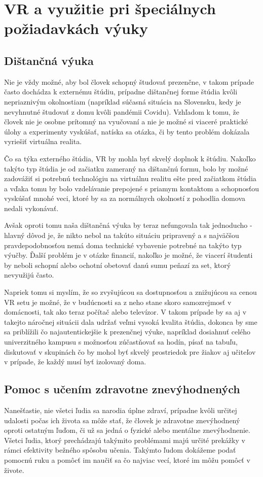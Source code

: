 \documentclass[10pt,twoside,slovak,a4paper]{article}
\begin{document}
\section{VR a využitie pri špeciálnych požiadavkách výuky} \label{stvrta}

\subsection{Dištančná výuka} \label{pomoc}
Nie je vždy možné, aby bol človek schopný študovať prezenčne, v takom prípade často dochádza k externému štúdiu, prípadne dištančnej forme štúdia kvôli nepriaznivým okolnostiam (napríklad súčasná situácia na Slovensku, kedy je nevyhnutné študovať z domu kvôli pandémii Covidu). Vzhľadom k tomu, že človek nie je osobne prítomný na vyučovaní a nie je možné si viaceré praktické úlohy a experimenty vyskúšať, natíska sa otázka, či by tento problém dokázala vyriešiť virtuálna realita.

Čo sa týka externého štúdia, VR by mohla byť skvelý doplnok k štúdiu. Nakoľko takýto typ štúdia je od začiatku zameraný na dištančnú formu, bolo by možné zadovážiť si potrebnú technológiu na virtuálnu realitu ešte pred začiatkom štúdia a vďaka tomu by bolo vzdelávanie prepojené s priamym kontaktom a schopnosťou vyskúšať mnohé veci, ktoré by sa za normálnych okolností z pohodlia domova nedali vykonávať.

Avšak oproti tomu naša dištančná výuka by teraz nefungovala tak jednoducho - hlavný dôvod je, že nikto nebol na takúto situáciu pripravený a s najväčšou pravdepodobnosťou nemá doma technické vybavenie potrebné na takýto typ výučby. Ďalší problém je v otázke financií, nakoľko je možné, že viacerí študenti by neboli schopní alebo ochotní obetovať danú sumu peňazí za set, ktorý nevyužijú často. 

Napriek tomu si myslím, že so zvyšujúcou sa dostupnosťou a znižujúcou sa cenou VR setu je možné, že v budúcnosti sa z neho stane skoro samozrejmosť v domácnosti, tak ako teraz počítač alebo televízor. V takom prípade by sa aj v takejto náročnej situácii dala udržať veľmi vysoká kvalita štúdia, dokonca by sme sa priblížili čo najautentickejšie k prezenčnej výuke, napríklad dosiahnuť celého univerzitného kampusu \cite{distancne} s možnosťou zúčastňovať sa hodín, písať na tabuľu, diskutovať v skupinách čo by mohol byť skvelý prostriedok pre žiakov aj učiteľov v prípade, že každý musí byť izolovaný doma.

\subsection{Pomoc s učením zdravotne znevýhodnených} \label{pomoc}
Nanešťastie, nie všetci ľudia sa narodia úplne zdraví, prípadne kvôli určitej udalosti počas ich života sa môže stať, že človek je zdravotne znevýhodnený oproti ostatným ľuďom, či už sa jedná o fyzické alebo mentálne znevýhodnenie. Všetci ľudia, ktorý prechádzajú takýmito problémami majú určité prekážky v rámci efektivity bežného spôsobu učenia. Takýmto ľudom dokážeme podať pomocnú ruku a pomôcť im naučiť sa čo najviac vecí, ktoré im môžu pomôcť v živote. 
\end{document}
